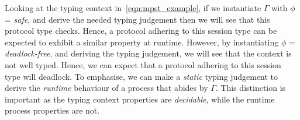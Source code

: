 Looking at the typing context in~\ref{eqn:mpst_example}, if we instantiate \textbf{\ensuremath{\Gamma}} with \textit{\ensuremath{\phi}} = \textit{safe}, and derive the needed typing judgement then we will see that this protocol type checks.
Hence, a protocol adhering to this session type can be expected to exhibit a similar property at runtime. 
However, by instantiating \textit{\ensuremath{\phi}} = \textit{deadlock-free}, and deriving the typing judgement, we will see that the context is not well typed.
Hence, we can expect that a protocol adhering to this session type will deadlock.
To emphasise, we can make a \textit{static} typing judgement to derive the \textit{runtime} behaviour of a process that abides by \textbf{\ensuremath{\Gamma}}.
This distinction is important as the typing context properties are \textit{decidable}, while the runtime process properties are not.

